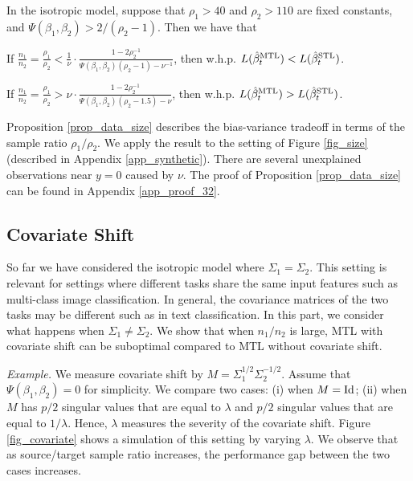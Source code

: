 \begin{proposition}\label{prop_data_size}
	In the isotropic model, suppose that $\rho_1 > 40$ and $\rho_2 > 110$ are fixed constants, and $\Psi(\beta_1, \beta_2) > 2/(\rho_2 - 1)$.
	Then we have that
	\squishlist
		\item If $\frac{n_1}{n_2} = \frac{\rho_1}{\rho_2} < \frac{1}{\nu} \cdot \frac{1 - 2\rho_2^{-1}}{\Psi(\beta_1, \beta_2) (\rho_2 - 1) - \nu^{-1}}$, then w.h.p. $L(\hat{\beta}_t^{\textup{MTL}}) < L(\hat{\beta}_t^{\textup{STL}})$.
		\item If $\frac{n_1}{n_2} = \frac{\rho_1}{\rho_2} > {\nu} \cdot \frac{1 - 2\rho_2^{-1}}{\Psi(\beta_1, \beta_2) (\rho_2 - 1.5) - \nu}$, then w.h.p. $L(\hat{\beta}_t^{\textup{MTL}}) > L(\hat{\beta}_t^{\textup{STL}})$.
	\squishend
\end{proposition}
Proposition \ref{prop_data_size} describes the bias-variance tradeoff in terms of the sample ratio $\rho_1 / \rho_2$.
We apply the result to the setting of Figure \ref{fig_size} (described in Appendix \ref{app_synthetic}).
There are several unexplained observations near $y = 0$ caused by $\nu$.
The proof of Proposition \ref{prop_data_size} can be found in Appendix \ref{app_proof_32}.

\subsection{Covariate Shift}\label{sec_covshift}

So far we have considered the isotropic model where $\Sigma_1 = \Sigma_2$.
This setting is relevant for settings where different tasks share the same input features such as multi-class image classification.
In general, the covariance matrices of the two tasks may be different such as in text classification.
In this part, we consider what happens when $\Sigma_1 \neq \Sigma_2$.
We show that when $n_1 / n_2$ is large, MTL with covariate shift can be suboptimal compared to MTL without covariate shift.

\textit{Example.}
	We measure covariate shift by $M = \Sigma_1^{1/2} \Sigma_2^{-1/2}$.
	Assume that $\Psi(\beta_1, \beta_2) = 0$ for simplicity.
	We compare two cases: (i) when $M = \operatorname{Id}$; (ii) when $M$ has $p/2$ singular values that are equal to $\lambda$ and $p/2$ singular values that are equal to $1 / \lambda$.
	Hence, $\lambda$ measures the severity of the covariate shift.
	Figure \ref{fig_covariate} shows a simulation of this setting by varying $\lambda$.
	We observe that as source/target sample ratio increases, the performance gap between the two cases increases.


